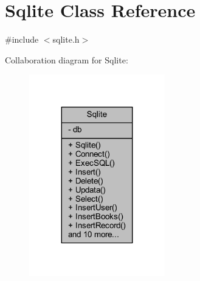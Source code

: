 \hypertarget{class_sqlite}{}\section{Sqlite Class Reference}
\label{class_sqlite}


{\ttfamily \#include $<$sqlite.\+h$>$}



Collaboration diagram for Sqlite\+:
\nopagebreak
\begin{figure}[H]
\begin{center}
\leavevmode
\includegraphics[width=167pt]{class_sqlite__coll__graph}
\end{center}
\end{figure}
